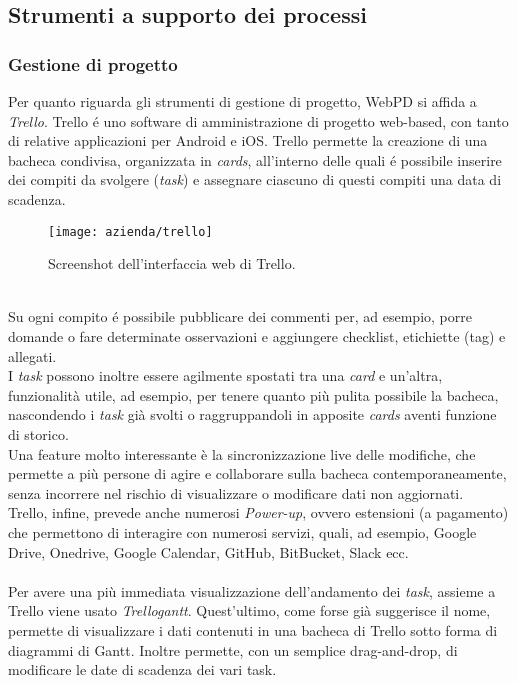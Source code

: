 \subsection{Strumenti a supporto dei processi}
\subsubsection{Gestione di progetto}
Per quanto riguarda gli strumenti di gestione di progetto, WebPD si affida a \textit{Trello}. 
Trello é uno software di amministrazione di progetto web-based, con tanto di relative applicazioni per Android e iOS. Trello permette la creazione di una bacheca condivisa, organizzata in \textit{cards}, all'interno delle quali é possibile inserire dei compiti da svolgere (\textit{task}) e assegnare ciascuno di questi compiti una data di scadenza. \\
\begin{figure}[!h] 
	\centering 
	\texttt{[image: azienda/trello]} 
	\caption{Screenshot dell'interfaccia web di Trello.}
\end{figure}\\
Su ogni compito é possibile pubblicare dei commenti per, ad esempio, porre domande o fare determinate osservazioni e aggiungere checklist, etichiette (tag) e allegati.\\ 
I \textit{task} possono inoltre essere agilmente spostati tra una \textit{card} e un'altra, funzionalità utile, ad esempio, per tenere quanto più pulita possibile la bacheca, nascondendo i \textit{task} già svolti o raggruppandoli in apposite \textit{cards} aventi funzione di storico.\\
Una feature molto interessante è la sincronizzazione live delle modifiche, che permette a più persone di agire e collaborare sulla bacheca contemporaneamente, senza incorrere nel rischio di visualizzare o modificare dati non aggiornati.\\
Trello, infine, prevede anche numerosi \textit{Power-up}, ovvero estensioni (a pagamento) che permettono di interagire con numerosi servizi, quali, ad esempio, Google Drive, Onedrive, Google Calendar, GitHub, BitBucket, Slack ecc.\\
\\
Per avere una più immediata visualizzazione dell'andamento dei \textit{task}, assieme a Trello viene usato \textit{Trellogantt}. Quest'ultimo, come forse già suggerisce il nome, permette di visualizzare i dati contenuti in una bacheca di Trello sotto forma di diagrammi di Gantt. Inoltre permette, con un semplice drag-and-drop, di modificare le date di scadenza dei vari task.\\

